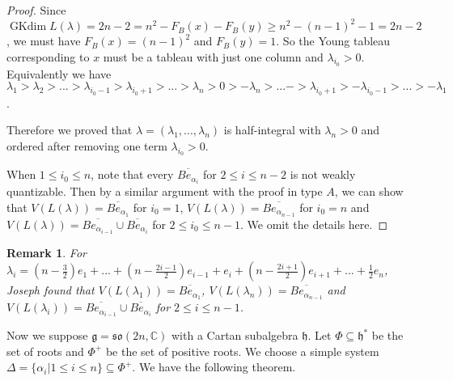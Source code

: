 \documentclass{amsart}[12pt]
\newtheorem{Rem}{Remark}[section]
\renewcommand{\subset}{\subseteq}
\newcommand{\gkd}{\operatorname{GKdim}}
\numberwithin{equation}{section}
\begin{document}
\begin{proof}
Since $\gkd L(\lambda)=2n-2=n^2-F_B(x)-F_B(y)\geq n^2-(n-1)^2-1=2n-2$, we must have $F_B(x)=(n-1)^2$ and $F_B(y)=1$.
So the Young tableau corresponding to $x$ must be a  tableau with just one column and $\lambda_{i_0}>0$. Equivalently we have $\lambda_1>\lambda_2>...>\lambda_{i_0-1}>\lambda_{i_0+1}>...>\lambda_n>0>-\lambda_n>...->\lambda_{i_0+1}>-\lambda_{i_0-1}>...>-\lambda_1$.

Therefore we proved that 	$\lambda=(\lambda_1,...,\lambda_n)$ is half-integral with $\lambda_n>0$ and ordered after removing one term $\lambda_{i_0}>0$.


When $1\leq i_0\leq n$, note that every $\overline{Be_{\alpha_i}}$ for $ 2\leq i\leq n-2$ is not weakly quantizable. Then by a similar argument with the proof in type $A$, we can show that $V(L(\lambda))=\overline{Be_{\alpha_{1}}}$ for $i_0=1$, $V(L(\lambda))=\overline{Be_{\alpha_{n-1}}}$ for $i_0=n$ and $V(L(\lambda))=\overline{Be_{\alpha_{i-1}}}\cup \overline{Be_{\alpha_{i}}}$ for $2\leq i_0\leq n-1$. We omit the details here.
\end{proof}


\begin{Rem}
For  $\lambda_i=(n-\frac{3}{2})e_1+...+(n-\frac{2i-1}{2})e_{i-1}+e_{i}+(n-\frac{2i+1}{2})e_{i+1}+...+\frac{1}{2}e_n$, Joseph \cite{Jo98} found that $V(L(\lambda_{1}))=\overline{Be_{\alpha_{1}}}$, $V(L(\lambda_{n}))=\overline{Be_{\alpha_{n-1}}}$ and $V(L(\lambda_i))=\overline{Be_{\alpha_{i-1}}}\cup \overline{Be_{\alpha_{i}}}$ for $2\leq i\leq n-1$.

	
\end{Rem}




Now	we suppose  $\mathfrak{g}=\mathfrak{so}(2n, \mathbb{C})$ with a Cartan subalgebra $\mathfrak{h}$. Let $\Phi\subseteq \mathfrak{h}^*$ be the set of roots and $\Phi^+$ be the set of positive roots. We choose  a simple system $\Delta=\{\alpha_i|1\leq i\leq n\}\subset\Phi^+$. We have the following theorem.
\end{document}
